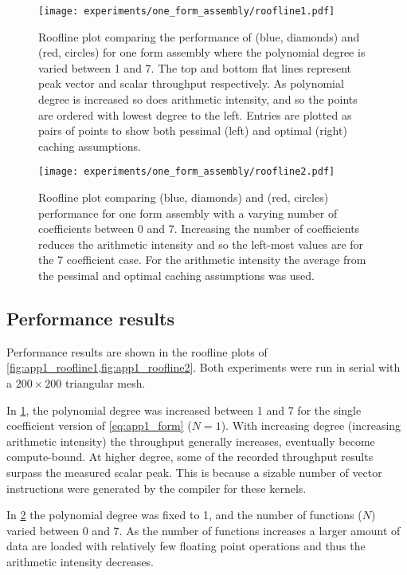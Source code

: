 \documentclass[thesis]{subfiles}
\begin{document}
\begin{figure}
  \centering
  \texttt{[image: experiments/one\_form\_assembly/roofline1.pdf]}
  \caption{
    Roofline plot comparing the performance of  (blue, diamonds) and  (red, circles) for one form assembly where the polynomial degree is varied between 1 and 7.
    The top and bottom flat lines represent peak vector and scalar throughput respectively.
    As polynomial degree is increased so does arithmetic intensity, and so the points are ordered with lowest degree to the left.
    Entries are plotted as pairs of points to show both pessimal (left) and optimal (right) caching assumptions.
  }
  \label{fig:app1_roofline1}
\end{figure}

\begin{figure}
  \centering
  \texttt{[image: experiments/one\_form\_assembly/roofline2.pdf]}
  \caption{
    Roofline plot comparing  (blue, diamonds) and  (red, circles) performance for one form assembly with a varying number of coefficients between 0 and 7.
    Increasing the number of coefficients reduces the arithmetic intensity and so the left-most values are for the 7 coefficient case.
    For the arithmetic intensity the average from the pessimal and optimal caching assumptions was used.
  }
  \label{fig:app1_roofline2}
\end{figure}

\subsection{Performance results}

Performance results are shown in the roofline plots of \cref{fig:app1_roofline1,fig:app1_roofline2}.
Both experiments were run in serial with a $200 \times 200$ triangular mesh.

In \cref{fig:app1_roofline1}, the polynomial degree was increased between 1 and 7 for the single coefficient version of \cref{eq:app1_form} ($N=1$).
With increasing degree (increasing arithmetic intensity) the throughput generally increases, eventually become compute-bound.
At higher degree, some of the recorded throughput results surpass the measured scalar peak.
This is because a sizable number of vector instructions were generated by the compiler for these kernels.

In \cref{fig:app1_roofline2} the polynomial degree was fixed to 1, and the number of functions ($N$) varied between 0 and 7.
As the number of functions increases a larger amount of data are loaded with relatively few floating point operations and thus the arithmetic intensity decreases.
\end{document}
